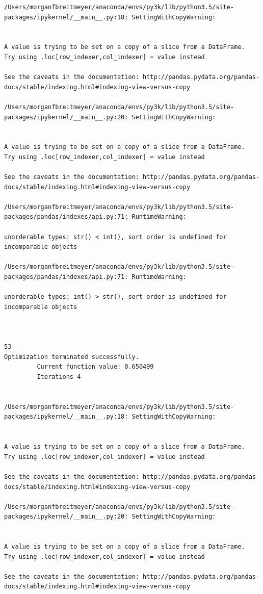 \begin{lstlisting}
/Users/morganfbreitmeyer/anaconda/envs/py3k/lib/python3.5/site-packages/ipykernel/__main__.py:18: SettingWithCopyWarning:


A value is trying to be set on a copy of a slice from a DataFrame.
Try using .loc[row_indexer,col_indexer] = value instead

See the caveats in the documentation: http://pandas.pydata.org/pandas-docs/stable/indexing.html#indexing-view-versus-copy

/Users/morganfbreitmeyer/anaconda/envs/py3k/lib/python3.5/site-packages/ipykernel/__main__.py:20: SettingWithCopyWarning:


A value is trying to be set on a copy of a slice from a DataFrame.
Try using .loc[row_indexer,col_indexer] = value instead

See the caveats in the documentation: http://pandas.pydata.org/pandas-docs/stable/indexing.html#indexing-view-versus-copy

/Users/morganfbreitmeyer/anaconda/envs/py3k/lib/python3.5/site-packages/pandas/indexes/api.py:71: RuntimeWarning:

unorderable types: str() < int(), sort order is undefined for incomparable objects

/Users/morganfbreitmeyer/anaconda/envs/py3k/lib/python3.5/site-packages/pandas/indexes/api.py:71: RuntimeWarning:

unorderable types: int() > str(), sort order is undefined for incomparable objects



53
Optimization terminated successfully.
         Current function value: 0.650499
         Iterations 4


/Users/morganfbreitmeyer/anaconda/envs/py3k/lib/python3.5/site-packages/ipykernel/__main__.py:18: SettingWithCopyWarning:


A value is trying to be set on a copy of a slice from a DataFrame.
Try using .loc[row_indexer,col_indexer] = value instead

See the caveats in the documentation: http://pandas.pydata.org/pandas-docs/stable/indexing.html#indexing-view-versus-copy

/Users/morganfbreitmeyer/anaconda/envs/py3k/lib/python3.5/site-packages/ipykernel/__main__.py:20: SettingWithCopyWarning:


A value is trying to be set on a copy of a slice from a DataFrame.
Try using .loc[row_indexer,col_indexer] = value instead

See the caveats in the documentation: http://pandas.pydata.org/pandas-docs/stable/indexing.html#indexing-view-versus-copy


\end{lstlisting}
